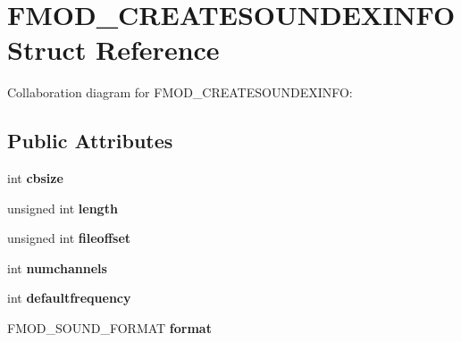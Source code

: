 \hypertarget{struct_f_m_o_d___c_r_e_a_t_e_s_o_u_n_d_e_x_i_n_f_o}{\section{F\+M\+O\+D\+\_\+\+C\+R\+E\+A\+T\+E\+S\+O\+U\+N\+D\+E\+X\+I\+N\+F\+O Struct Reference}
\label{struct_f_m_o_d___c_r_e_a_t_e_s_o_u_n_d_e_x_i_n_f_o}
}


Collaboration diagram for F\+M\+O\+D\+\_\+\+C\+R\+E\+A\+T\+E\+S\+O\+U\+N\+D\+E\+X\+I\+N\+F\+O\+:
\subsection*{Public Attributes}
\begin{DoxyCompactItemize}
\item 
\hypertarget{struct_f_m_o_d___c_r_e_a_t_e_s_o_u_n_d_e_x_i_n_f_o_a905941acdbc5922a694fbb44761a1fa6}{int {\bfseries cbsize}}\label{struct_f_m_o_d___c_r_e_a_t_e_s_o_u_n_d_e_x_i_n_f_o_a905941acdbc5922a694fbb44761a1fa6}

\item 
\hypertarget{struct_f_m_o_d___c_r_e_a_t_e_s_o_u_n_d_e_x_i_n_f_o_a4747dfdcc1a5b3aa8429b265655a0745}{unsigned int {\bfseries length}}\label{struct_f_m_o_d___c_r_e_a_t_e_s_o_u_n_d_e_x_i_n_f_o_a4747dfdcc1a5b3aa8429b265655a0745}

\item 
\hypertarget{struct_f_m_o_d___c_r_e_a_t_e_s_o_u_n_d_e_x_i_n_f_o_a7b44d4b86cadbcd0b82f7103312d64ae}{unsigned int {\bfseries fileoffset}}\label{struct_f_m_o_d___c_r_e_a_t_e_s_o_u_n_d_e_x_i_n_f_o_a7b44d4b86cadbcd0b82f7103312d64ae}

\item 
\hypertarget{struct_f_m_o_d___c_r_e_a_t_e_s_o_u_n_d_e_x_i_n_f_o_a07286cab031745284732e094ca8f722e}{int {\bfseries numchannels}}\label{struct_f_m_o_d___c_r_e_a_t_e_s_o_u_n_d_e_x_i_n_f_o_a07286cab031745284732e094ca8f722e}

\item 
\hypertarget{struct_f_m_o_d___c_r_e_a_t_e_s_o_u_n_d_e_x_i_n_f_o_abc2bb4d103afbbffb3cfdda4dc54b10b}{int {\bfseries defaultfrequency}}\label{struct_f_m_o_d___c_r_e_a_t_e_s_o_u_n_d_e_x_i_n_f_o_abc2bb4d103afbbffb3cfdda4dc54b10b}

\item 
\hypertarget{struct_f_m_o_d___c_r_e_a_t_e_s_o_u_n_d_e_x_i_n_f_o_a1cfd3a1633370ea3016f722f8c2531ce}{F\+M\+O\+D\+\_\+\+S\+O\+U\+N\+D\+\_\+\+F\+O\+R\+M\+A\+T {\bfseries format}}\label{struct_f_m_o_d___c_r_e_a_t_e_s_o_u_n_d_e_x_i_n_f_o_a1cfd3a1633370ea3016f722f8c2531ce}


\end{DoxyCompactItemize}
